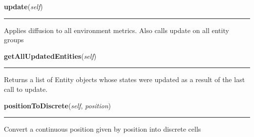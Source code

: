     \label{Birds:GameState:GameState:update}

    \vspace{0.5ex}

\hspace{.8\funcindent}\begin{boxedminipage}{\funcwidth}

    \raggedright \textbf{update}(\textit{self})

    \vspace{-1.5ex}

    \rule{\textwidth}{0.5\fboxrule}
\setlength{\parskip}{2ex}
    Applies diffusion to all environment metrics.  Also calls update on all
    entity groups

\setlength{\parskip}{1ex}
    \end{boxedminipage}

    \label{Birds:GameState:GameState:getAllUpdatedEntities}

    \vspace{0.5ex}

\hspace{.8\funcindent}\begin{boxedminipage}{\funcwidth}

    \raggedright \textbf{getAllUpdatedEntities}(\textit{self})

    \vspace{-1.5ex}

    \rule{\textwidth}{0.5\fboxrule}
\setlength{\parskip}{2ex}
    Returns a list of Entity objects whose states were updated as a result 
    of the last call to update.

\setlength{\parskip}{1ex}
    \end{boxedminipage}

    \label{Birds:GameState:GameState:positionToDiscrete}

    \vspace{0.5ex}

\hspace{.8\funcindent}\begin{boxedminipage}{\funcwidth}

    \raggedright \textbf{positionToDiscrete}(\textit{self}, \textit{position})

    \vspace{-1.5ex}

    \rule{\textwidth}{0.5\fboxrule}
\setlength{\parskip}{2ex}
    Convert a continuous position given by position into discrete cells

\setlength{\parskip}{1ex}
    \end{boxedminipage}

